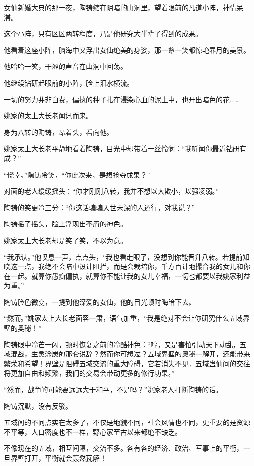 \begin{this_body}
女仙新婚大典的那一夜，陶铸缩在阴暗的山洞里，望着眼前的凡道小阵，神情呆滞。

这个小阵，只有区区两转程度，乃是他研究大半辈子得到的成果。

他看着这座小阵，脑海中又浮出女仙绝美的身姿，那一颦一笑都惊艳春月的美景。

他哈哈一笑，干涩的声音在山洞中回荡。

他继续钻研起眼前的小阵，脸上泪水横流。

一切的努力并非白费，偏执的种子扎在浸染心血的泥土中，也开出暗色的花……

姚家的太上大长老闻讯而来。

身为八转的陶铸，昂着头，看向他。

姚家太上大长老平静地看着陶铸，目光中却带着一丝怜悯：“我听闻你最近钻研有成？”

“侥幸。”陶铸冷笑，“你此次来，是想抢夺成果？”

对面的老人缓缓摇头：“你才刚刚八转，我并不想以大欺小，以强凌弱。”

陶铸的笑更冷三分：“你这话骗骗入世未深的人还行，对我说？”

陶铸摇了摇头，脸上浮现出不屑的神色。

姚家太上大长老却是笑了笑，不以为意。

“我承认。”他叹息一声，点点头，“我也看走眼了，没想到你能晋升八转。若提前知晓这一点，我绝不会暗中设计阻拦，而是会栽培你，千方百计地撮合我的女儿和你在一起。就算你愚痴偏执，就算你不能让我的女儿幸福，一切也都要以我姚家利益为重。”

陶铸脸色微变，一提到他深爱的女仙，他的目光顿时晦暗下去。

“然而。”姚家太上大长老面容一肃，语气加重，“我是绝对不会让你研究什么五域界壁的奥秘！”

陶铸眼中冷芒一闪，顿时恢复之前的冷酷神色：“哼，又是害怕引动天下动乱，五域混战，生灵涂炭的那套说辞？然而你可想过？五域界壁的奥秘一解开，还能带来繁荣和希望！界壁是阻碍五域交流的重大障碍，它若消失不见，五域蛊仙间的交往将更加自由和频繁，我们的交易会带动更多的修行功果。”

“然而，战争的可能要远远大于和平，不是吗？”姚家老人打断陶铸的话。

陶铸沉默，没有反驳。

五域间的不同点实在太多了，不仅是地貌不同，社会风情也不同，更重要的是资源不平等，人口密度也不一样，野心家至古以来都绝不缺乏。

不像现在的五域，相互间隔，交流不多。各有各的经济、政治、军事上的平衡，一旦界壁打开，平衡就会轰然瓦解！


\end{this_body}
